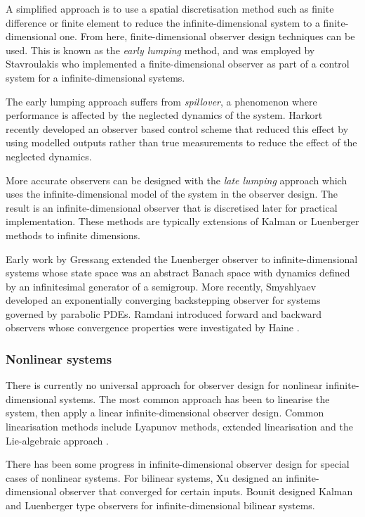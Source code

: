 A simplified approach is to use a spatial discretisation method such as finite difference or finite element to reduce the infinite-dimensional system to a finite-dimensional one. From here, finite-dimensional observer design techniques can be used. This is known as the \textit{early lumping} method, and was employed by Stavroulakis \cite{stavroulakis1973design} who implemented a finite-dimensional observer as part of a control system for a infinite-dimensional systems.

The early lumping approach suffers from \textit{spillover}, a phenomenon where performance is affected by the neglected dynamics of the system\cite{meirovitch1983problem}. Harkort \cite{harkort2011finite} recently developed an observer based control scheme that reduced this effect by using modelled outputs rather than true measurements to reduce the effect of the neglected dynamics.

More accurate observers can be designed with the \textit{late lumping} approach which uses the infinite-dimensional model of the system in the observer design. The result is an infinite-dimensional observer that is discretised later for practical implementation. These methods are typically extensions of Kalman or Luenberger methods to infinite dimensions. 

Early work by Gressang \cite{gressang1975observers} extended the Luenberger observer to infinite-dimensional systems whose state space was an abstract Banach space with dynamics defined by an infinitesimal generator of a semigroup. More recently, Smyshlyaev \cite{smyshlyaev2005backstepping} developed an exponentially converging backstepping observer for systems governed by parabolic PDEs. Ramdani introduced forward and backward observers \cite{ramdani2010recovering} whose convergence properties were investigated by Haine \cite{haine2014recovering}.

\subsubsection{Nonlinear systems}
There is currently no universal approach for observer design for nonlinear infinite-dimensional systems.
The most common approach has been to linearise the system, then apply a linear infinite-dimensional observer design. Common linearisation methods include Lyapunov methods, extended linearisation and the Lie-algebraic approach \cite{primbs1996survey}.

There has been some progress in infinite-dimensional observer design for special cases of nonlinear systems. For bilinear systems, Xu \cite{xu1995observer} designed an infinite-dimensional observer that converged for certain inputs. Bounit \cite{bounit1997observers} designed Kalman and Luenberger type observers for infinite-dimensional bilinear systems. 

